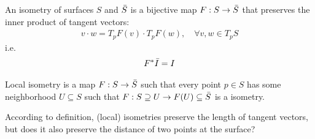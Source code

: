 \documentclass[10pt]{article}
\begin{document}
            \begin{definition}
                An isometry of surfaces $S$ and $\Bar{S}$ is a bijective map $F: S\rightarrow\Bar{S}$ that preserves the inner product of tangent vectors:
                \begin{equation*}
                    \begin{aligned}
                        v\cdot w = T_pF(v)\cdot T_pF(w), \quad\forall v, w \in T_pS
                    \end{aligned}
                \end{equation*}
                i.e.
                \begin{equation*}
                    \begin{aligned}
                        F^*\Bar{I} = I
                    \end{aligned}
                \end{equation*}
            \end{definition}
            \begin{definition}
                Local isometry is a map $F: S\rightarrow\Bar{S}$ such that every point $p\in S$ has some neighborhood $U\subseteq S$ such that $F: S\supseteq U\rightarrow F(U)\subseteq\Bar{S}$ is a isometry.
            \end{definition}
            According to definition, (local) isometries preserve the length of tangent vectors, but does it also preserve the distance of two points at the surface?
\end{document}
